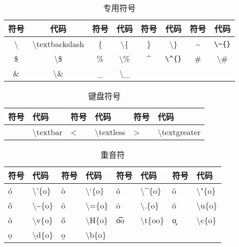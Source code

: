 \documentclass[UTF8,fontset=ubuntu]{ctexart}
\begin{document}
\begin{table}[H]
\begin{minipage}{\textwidth}
\begin{tabular}{c c c c c c c c}
	\hline
	符号 & 代码 & 符号 & 代码 & 符号 & 代码 & 符号 & 代码\\
	\hline
	\textbackslash  & \textbackslash  textbackslash & \{ & \textbackslash \{ & \} & \textbackslash \} & \~{} & \verb|\~{}|\\
	\$ & \textbackslash \$ & \% & \textbackslash \% & \^{} & \verb|\^{}| & \# & \textbackslash \#\\
	\& & \textbackslash \& & \_ & \textbackslash \_\\
	\hline
\end{tabular}
\end{minipage}
\caption{专用符号}
\end{table}

\begin{table}[H]
\begin{minipage}{\textwidth}
\begin{tabular}{l l l l l l}
	\hline
	符号 & 代码 & 符号 & 代码 & 符号 & 代码\\
	\hline
	\textbar & \textbackslash  textbar & \textless & \textbackslash  textless & \textgreater & \textbackslash  textgreater\\
	\hline
\end{tabular}
\end{minipage}
\caption{键盘符号}
\end{table}

\begin{table}[H]
\begin{tabular}{l l l l l l l l}
	\hline
	符号 & 代码 & 符号 & 代码 & 符号 & 代码 & 符号 & 代码\\
	\hline
	\'{o} & \textbackslash '\{o\} & \`{o} & \textbackslash `\{o\} & \^{o} & \textbackslash \^{}\{o\} & \"{o} & \textbackslash "\{o\}\\
	\~{o} & \textbackslash \~{}\{o\} & \={o} & \textbackslash =\{o\} & \.{o} & \textbackslash .\{o\} & \u{o} & \textbackslash  u\{o\}\\
	\v{o} & \textbackslash  v\{o\} & \H{o} & \textbackslash  H\{o\} & \t{oo} & \textbackslash  t\{oo\} & \c{o} & \textbackslash  c\{o\}\\
	\d{o} & \textbackslash  d\{o\} & \b{o} & \textbackslash  b\{o\}\\
	\hline
\end{tabular}
\caption{重音符}
\end{table}
\end{document}
